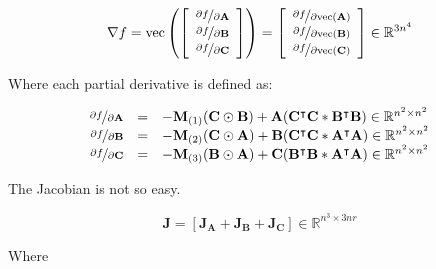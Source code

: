     \begin{equation} \label{eq:cp_dgn_gradient}
        \nabla f = \text{vec}
        \left(
        \left[
        \begin{array}{c}
            \nicefrac{\partial f}{\partial \mathbf{A}} \\
            \nicefrac{\partial f}{\partial \mathbf{B}} \\
            \nicefrac{\partial f}{\partial \mathbf{C}}
        \end{array}
        \right]
        \right) = 
        \left[
            \begin{array}{c}
                \nicefrac{\partial f}{\partial \text{vec}(\mathbf{A})} \\
                \nicefrac{\partial f}{\partial \text{vec}(\mathbf{B})} \\
                \nicefrac{\partial f}{\partial \text{vec}(\mathbf{C})}
            \end{array}
        \right]
        \in \mathbb{R}^{3n^4}
    \end{equation}

    Where each partial derivative is defined as:

    \begin{equation}
        \begin{array}{rcl}
            \nicefrac{\partial f}{\partial \mathbf{A}} & = & -\mathbf{M}_{(1)}(\mathbf{C\odot B}) + \mathbf{A(C^\intercal C\ast B^\intercal B)}\in \mathbb{R}^{n^2\times n^2} \\ 
            \nicefrac{\partial f}{\partial \mathbf{B}} & = & -\mathbf{M}_{(2)}(\mathbf{C\odot A}) + \mathbf{B(C^\intercal C\ast A^\intercal A)}\in \mathbb{R}^{n^2\times n^2} \\ 
            \nicefrac{\partial f}{\partial \mathbf{C}} & = & -\mathbf{M}_{(3)}(\mathbf{B\odot A}) + \mathbf{C(B^\intercal B\ast A^\intercal A)}\in \mathbb{R}^{n^2\times n^2} 
        \end{array}
        \label{eq:cp_dgn_partials}
    \end{equation}
    
    The Jacobian is not so easy. 
    
    \begin{equation} \label{eq:cp_dgn_jacobian}
        \mathbf{J} = [\mathbf{J}_\mathbf{A} + \mathbf{J}_\mathbf{B} + \mathbf{J}_\mathbf{C}] \in \mathbb{R}^{n^3\times 3nr}
    \end{equation}
    
    Where
    
